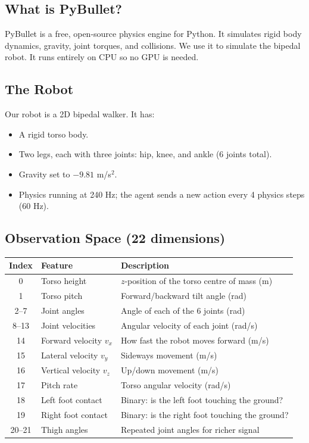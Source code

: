 \documentclass[12pt, a4paper]{article}
\begin{document}
\subsection{What is PyBullet?}

PyBullet is a free, open-source physics engine for Python. It simulates rigid body dynamics, gravity, joint torques, and collisions. We use it to simulate the bipedal robot. It runs entirely on CPU so no GPU is needed.

\subsection{The Robot}

Our robot is a 2D bipedal walker. It has:
\begin{itemize}
    \item A rigid torso body.
    \item Two legs, each with three joints: hip, knee, and ankle (6 joints total).
    \item Gravity set to $-9.81$ m/s$^2$.
    \item Physics running at 240 Hz; the agent sends a new action every 4 physics steps (60 Hz).
\end{itemize}

\subsection{Observation Space (22 dimensions)}

\begin{center}
\begin{tabular}{cll}
    \toprule
    Index & Feature & Description \\
    \midrule
    0 & Torso height & $z$-position of the torso centre of mass (m) \\
    1 & Torso pitch & Forward/backward tilt angle (rad) \\
    2--7 & Joint angles & Angle of each of the 6 joints (rad) \\
    8--13 & Joint velocities & Angular velocity of each joint (rad/s) \\
    14 & Forward velocity $v_x$ & How fast the robot moves forward (m/s) \\
    15 & Lateral velocity $v_y$ & Sideways movement (m/s) \\
    16 & Vertical velocity $v_z$ & Up/down movement (m/s) \\
    17 & Pitch rate & Torso angular velocity (rad/s) \\
    18 & Left foot contact & Binary: is the left foot touching the ground? \\
    19 & Right foot contact & Binary: is the right foot touching the ground? \\
    20--21 & Thigh angles & Repeated joint angles for richer signal \\
    \bottomrule
\end{tabular}
\end{center}
\end{document}
